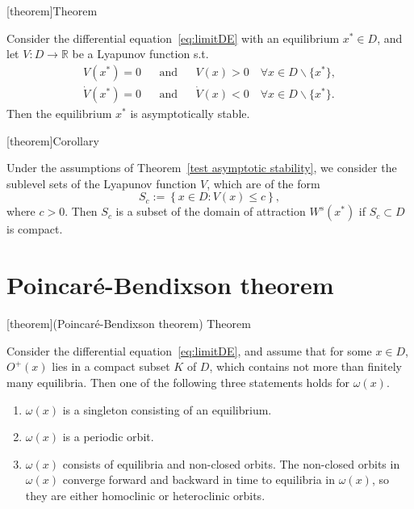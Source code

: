 \documentclass[12pt]{report}
\theoremstyle{definition}
\begin{document}
[theorem]{Theorem}
\begin{Lyapunov's direct method for asymptotic stability}\label{test asymptotic stability}
    Consider the differential equation~\eqref{eq:limitDE} with an equilibrium
    $x^*\in D$, and let $V:D\rightarrow\mathbb{R}$ be a Lyapunov function s.t.
    \begin{align*}
        V(x^*)=0 && \text{and} && V(x)>0 \quad\forall x\in D\backslash\{x^*\}, \\
        \dot{V}(x^*)=0 && \text{and} && \dot{V}(x)<0 \quad\forall x\in D\backslash\{x^*\}.
    \end{align*} 
    Then the equilibrium $x^*$ is asymptotically stable.
\end{Lyapunov's direct method for asymptotic stability}

[theorem]{Corollary}
\begin{sublevell sets of Lyapunov functions are ...}
    Under the assumptions of Theorem~\ref{test asymptotic stability}, we
    consider the sublevel sets of the Lyapunov function $V$, which are of the
    form
    \[
        S_c:=\left\{x\in D:V(x)\le c\right\},
    \]
    where $c>0$. Then $S_c$ is a subset of the domain of attraction
    $W^{s}(x^{*})$ if $S_c\subset D$ is compact.
\end{sublevell sets of Lyapunov functions are ...}

\section{Poincar\'{e}-Bendixson theorem}

[theorem]{(Poincar\'{e}-Bendixson theorem) Theorem}
\begin{Poincare-Bendixson theorem}
    Consider the differential equation~\eqref{eq:limitDE},
    and assume that for some $x\in D$, $O^{+}(x)$ lies in a compact subset $K$
    of $D$, which contains not more than finitely many equilibria.
    Then one of the following three statements holds for $\omega(x)$.
    \begin{enumerate}[label = (\roman*)]
        \item $\omega(x)$ is a singleton consisting of an equilibrium.
        \item $\omega(x)$ is a periodic orbit.
        \item $\omega(x)$ consists of equilibria and non-closed orbits.
            The non-closed orbits in $\omega(x)$ converge forward and backward
            in time to equilibria in $\omega(x)$, so they are either homoclinic
            or heteroclinic orbits.
    \end{enumerate} 
\end{Poincare-Bendixson theorem}
\end{document}
